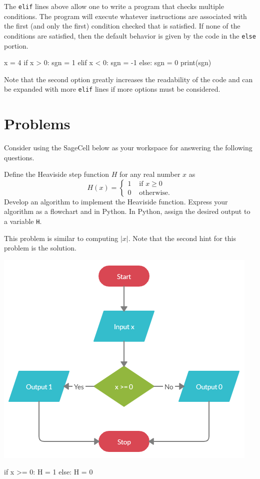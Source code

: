\documentclass{ximera}
\begin{document}
The \verb|elif| lines above allow one to write a program that checks multiple conditions. The program will execute whatever instructions are associated with the first (and only the first) condition checked that is satisfied. If none of the conditions are satisfied, then the default behavior is given by the code in the \verb|else| portion.

\begin{sageCell}
x = 4
if x > 0:
        sgn = 1
elif x < 0:
        sgn = -1
else:
        sgn = 0
print(sgn)
\end{sageCell}

Note that the second option greatly increases the readability of the code and can be expanded with more \verb|elif| lines if more options must be considered.

\section{Problems}

Consider using the SageCell below as your workspace for answering the following questions.

\begin{question}
Define the Heaviside step function $H$ for any real number $x$ as
	$$H(x)=\begin{cases} 1 &\text{ if $x\geq 0$}\\
		0 &\text{ otherwise.}
	\end{cases}$$
Develop an algorithm to implement the Heaviside function. Express your algorithm as a flowchart and in Python. In Python, assign the desired output to a variable \verb|H|.
	\begin{hint}
		This problem is similar to computing $|x|$. Note that the second hint for this problem is the solution.
	\end{hint}
	\begin{hint}
	\begin{center}
		\includegraphics{heaviside.png}
	\end{center}
\begin{sageCell}
if x >= 0:
        H = 1
else:
        H = 0
\end{sageCell}
	\end{hint}
\end{question}
\end{document}
